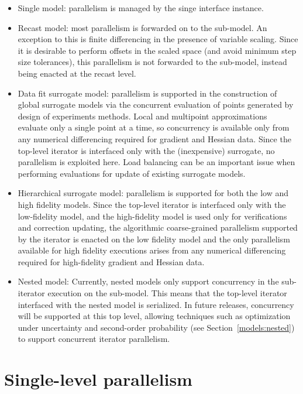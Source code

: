 \begin{itemize}
\item Single model: parallelism is managed by the singe interface instance.

\item Recast model: most parallelism is forwarded on to the sub-model.
An exception to this is finite differencing in the presence of
variable scaling.  Since it is desirable to perform offsets in the
scaled space (and avoid minimum step size tolerances), this
parallelism is not forwarded to the sub-model, instead being enacted
at the recast level.

\item Data fit surrogate model: parallelism is supported in the
construction of global surrogate models via the concurrent evaluation
of points generated by design of experiments methods.  Local and
multipoint approximations evaluate only a single point at a time, so
concurrency is available only from any numerical differencing required
for gradient and Hessian data.  Since the top-level iterator is
interfaced only with the (inexpensive) surrogate, no parallelism is
exploited here.  Load balancing can be an important issue when
performing evaluations for update of existing surrogate models.

\item Hierarchical surrogate model: parallelism is supported for both
the low and high fidelity models.  Since the top-level iterator is
interfaced only with the low-fidelity model, and the high-fidelity
model is used only for verifications and correction updating, the
algorithmic coarse-grained parallelism supported by the iterator is
enacted on the low fidelity model and the only parallelism available
for high fidelity executions arises from any numerical differencing
required for high-fidelity gradient and Hessian data.

\item Nested model: Currently, nested models only support concurrency
in the sub-iterator execution on the sub-model.  This means that the
top-level iterator interfaced with the nested model is serialized.  In
future releases, concurrency will be supported at this top level,
allowing techniques such as optimization under uncertainty and
second-order probability (see Section~\ref{models:nested}) to support
concurrent iterator parallelism.
\end{itemize}


\section{Single-level parallelism} \label{parallel:SLP}


